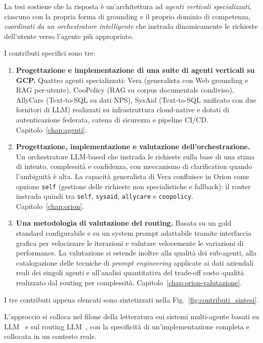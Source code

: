 La tesi sostiene che la risposta è un'architettura ad \emph{agenti verticali specializzati}, 
ciascuno con la propria forma di grounding e il proprio dominio di competenza, 
\emph{coordinati da un orchestratore intelligente} 
che instrada dinamicamente le richieste dell'utente verso l'agente più appropriato.

I contributi specifici sono tre:

\begin{enumerate}
  \item \textbf{Progettazione e implementazione di una suite di agenti verticali su GCP.} 
  Quattro agenti specializzati: 
  Vera (generalista con Web grounding e RAG per-utente), CooPolicy (RAG su corpus documentale condiviso), 
  AllyCare (Text-to-SQL su dati NPS), SysAid (Text-to-SQL unificato con due fornitori di LLM) realizzati su infrastruttura cloud-native
  e dotati di autenticazione federata, catena di sicurezza e pipeline CI/CD. 
  Capitolo~\ref{chap:agenti}.

  \item \textbf{Progettazione, implementazione e valutazione dell'orchestrazione.} 
  Un orchestratore LLM-based che instrada le richieste sulla base di una stima di intento, complessità e confidenza, 
  con meccanismo di clarification quando l'ambiguità è alta. 
  La capacità generalista di Vera confluisce in Orion come opzione \texttt{self} (gestione delle richieste non specialistiche e fallback): 
  il router instrada quindi tra \texttt{self}, \texttt{sysaid}, \texttt{allycare} e \texttt{coopolicy}. 
  Capitolo~\ref{chap:orion}.

  \item \textbf{Una metodologia di valutazione del routing.}
  Basata su un gold standard configurabile e su un system prompt adattabile
  tramite interfaccia grafica per velocizzare le iterazioni e valutare velocemente
  le variazioni di performance. La valutazione si estende inoltre alla qualità dei
  sub-agenti, alla catalogazione delle tecniche di \emph{prompt engineering} applicate
  ai dati aziendali reali dei singoli agenti e all'analisi quantitativa del trade-off
  costo--qualità realizzato dal routing per complessità.
  Capitolo~\ref{chap:orion-valutazione}.
\end{enumerate}

I tre contributi appena elencati sono sintetizzati nella Fig.~\ref{fig:contributi_sintesi}.

L'approccio si colloca nel filone della letteratura sui sistemi
multi-agente basati su LLM~\cite{wu2023autogen,guo2024multiagent} 
e sul routing LLM~\cite{ong2024routellm}, con la specificità di un'implementazione 
completa e collocata in un contesto reale.

